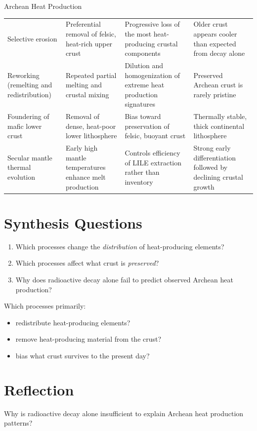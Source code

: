 \begin{activity}{Archean Heat Production}
\begin{table}[h!]
\begin{tabularx}{\textwidth}{@{}XXXX@{}}
    Selective erosion &
    Preferential removal of felsic, heat-rich upper crust &
    Progressive loss of the most heat-producing crustal components &
    Older crust appears cooler than expected from decay alone \\[0.3em]

    Reworking (remelting and redistribution) &
    Repeated partial melting and crustal mixing &
    Dilution and homogenization of extreme heat production signatures &
    Preserved Archean crust is rarely pristine \\[0.3em]

    Foundering of mafic lower crust &
    Removal of dense, heat-poor lower lithosphere &
    Bias toward preservation of felsic, buoyant crust &
    Thermally stable, thick continental lithosphere \\[0.3em]

    Secular mantle thermal evolution &
    Early high mantle temperatures enhance melt production &
    Controls efficiency of LILE extraction rather than inventory &
    Strong early differentiation followed by declining crustal growth \\

    \bottomrule
    \end{tabularx}
\end{table}

\section*{Synthesis Questions}
\begin{enumerate}
  \item Which processes change the \emph{distribution} of heat-producing elements?
  \item Which processes affect what crust is \emph{preserved}?
  \item Why does radioactive decay alone fail to predict observed Archean heat production?
\end{enumerate}

Which processes primarily:
\begin{itemize}
  \item redistribute heat-producing elements?
  \item remove heat-producing material from the crust?
  \item bias what crust survives to the present day?
\end{itemize}


\section*{Reflection}
Why is radioactive decay alone insufficient to explain Archean heat production patterns?


\end{activity}
